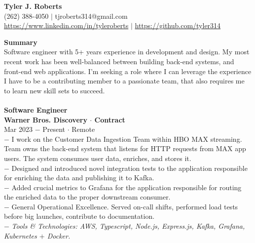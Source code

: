 \documentclass{resume}
\begin{document}
\begin{center}
{\LARGE \bf Tyler J. Roberts} \\[1mm]
\footnotesize
(262) 388-4050 $|$
tjroberts314@gmail.com \\[1mm]
\href{https://www.linkedin.com/in/tyleroberts}{https://www.linkedin.com/in/tyleroberts} $|$
\href{https://github.com/tyler314}{https://github.com/tyler314}
\end{center}
\begin{flushleft}

{\textbf{\large Summary}} \\
{
\footnotesize
\tab Software engineer with 5+ years experience in  development and design. My most recent work has been well-balanced between building back-end systems, and front-end  web applications. I'm seeking a role where I can leverage the experience I have to be a contributing member to a passionate team, that also requires me to learn new skill sets to succeed.
\\[4mm]
}
\\[2mm]

\normalsize{\bf Software Engineer}\\
\footnotesize{\bf Warner Bros. Discovery $\cdot$ Contract}\\
\footnotesize{Mar 2023 $-$ Present $\cdot$ Remote}\\[1mm]
{\scriptsize
	$-$ I work on the Customer Data Ingestion Team within HBO MAX streaming. Team owns the back-end system that listens for HTTP requests from MAX app users. The system consumes user data, enriches, and stores it.\\
	$-$ Designed and introduced novel integration tests to the application responsible for enriching the data and publishing it to Kafka.\\
	$-$ Added crucial metrics to Grafana for the application responsible for routing the enriched data to the proper downstream consumer.\\
	$-$ General Operational Excellence. Served on-call shifts, performed load tests before big launches, contribute to documentation.\\
	$-$ \textit{Tools \& Technologies: AWS, Typescript, Node.js, Express.js, Kafka, Grafana, Kubernetes $+$ Docker.}
}\\[3mm]


\end{flushleft}
\end{document}
